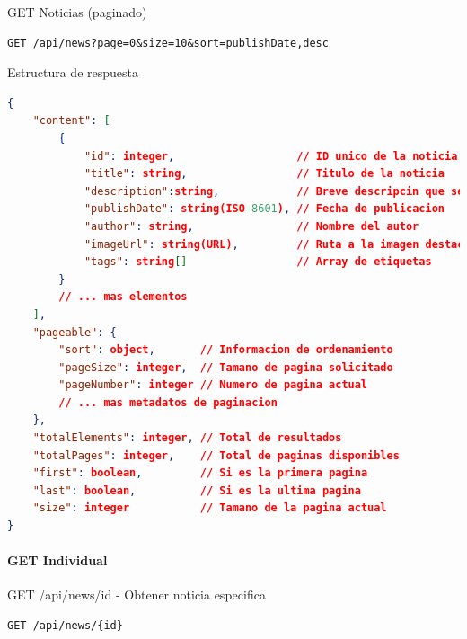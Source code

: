\documentclass[11pt,a4paper]{article}
\begin{document}
\begin{center}
	\begin{minipage}{\textwidth}
		\begin{codebox}{GET Noticias (paginado)}
			\begin{lstlisting}[language=HTTP]
GET /api/news?page=0&size=10&sort=publishDate,desc
\end{lstlisting}
		\end{codebox}
	\end{minipage}
\end{center}

\begin{center}
	\begin{minipage}{\textwidth}
		\begin{codebox}{Estructura de respuesta}
			\begin{lstlisting}[language=json]
{
    "content": [
        {
            "id": integer,                   // ID unico de la noticia
            "title": string,                 // Titulo de la noticia
			"description":string,			 // Breve descripcin que se muestra 
            "publishDate": string(ISO-8601), // Fecha de publicacion
            "author": string,                // Nombre del autor
            "imageUrl": string(URL),         // Ruta a la imagen destacada
            "tags": string[]                 // Array de etiquetas
        }
        // ... mas elementos
    ],
    "pageable": {
        "sort": object,       // Informacion de ordenamiento
        "pageSize": integer,  // Tamano de pagina solicitado
        "pageNumber": integer // Numero de pagina actual
        // ... mas metadatos de paginacion
    },
    "totalElements": integer, // Total de resultados
    "totalPages": integer,    // Total de paginas disponibles
    "first": boolean,         // Si es la primera pagina
    "last": boolean,          // Si es la ultima pagina
    "size": integer           // Tamano de la pagina actual
}
\end{lstlisting}
		\end{codebox}
	\end{minipage}
\end{center}

\paragraph{GET Individual}

\begin{center}
	\begin{minipage}{\textwidth}
		\begin{codebox}{GET /api/news/{id} - Obtener noticia especifica}
			\begin{lstlisting}[language=HTTP]
GET /api/news/{id}
\end{lstlisting}
		\end{codebox}
	\end{minipage}
\end{center}
\end{document}
